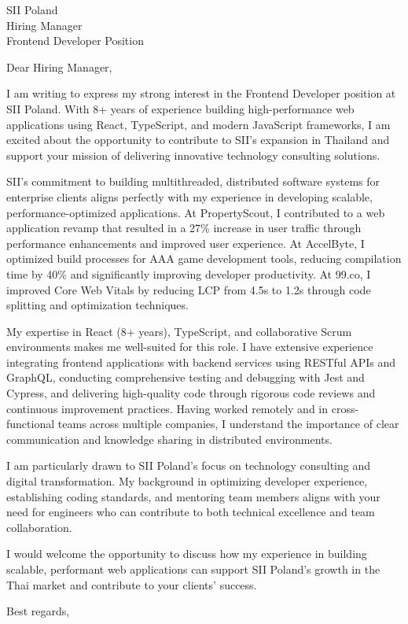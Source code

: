 \documentclass[11pt]{letter}
\begin{document}
\begin{letter}{SII Poland \\ Hiring Manager \\ Frontend Developer Position}

\opening{Dear Hiring Manager,}

I am writing to express my strong interest in the Frontend Developer position at SII Poland. With 8+ years of experience building high-performance web applications using React, TypeScript, and modern JavaScript frameworks, I am excited about the opportunity to contribute to SII's expansion in Thailand and support your mission of delivering innovative technology consulting solutions.

SII's commitment to building multithreaded, distributed software systems for enterprise clients aligns perfectly with my experience in developing scalable, performance-optimized applications. At PropertyScout, I contributed to a web application revamp that resulted in a 27\% increase in user traffic through performance enhancements and improved user experience. At AccelByte, I optimized build processes for AAA game development tools, reducing compilation time by 40\% and significantly improving developer productivity. At 99.co, I improved Core Web Vitals by reducing LCP from 4.5s to 1.2s through code splitting and optimization techniques.

My expertise in React (8+ years), TypeScript, and collaborative Scrum environments makes me well-suited for this role. I have extensive experience integrating frontend applications with backend services using RESTful APIs and GraphQL, conducting comprehensive testing and debugging with Jest and Cypress, and delivering high-quality code through rigorous code reviews and continuous improvement practices. Having worked remotely and in cross-functional teams across multiple companies, I understand the importance of clear communication and knowledge sharing in distributed environments.

I am particularly drawn to SII Poland's focus on technology consulting and digital transformation. My background in optimizing developer experience, establishing coding standards, and mentoring team members aligns with your need for engineers who can contribute to both technical excellence and team collaboration.

I would welcome the opportunity to discuss how my experience in building scalable, performant web applications can support SII Poland's growth in the Thai market and contribute to your clients' success.

\closing{Best regards,}

\end{letter}
\end{document}
